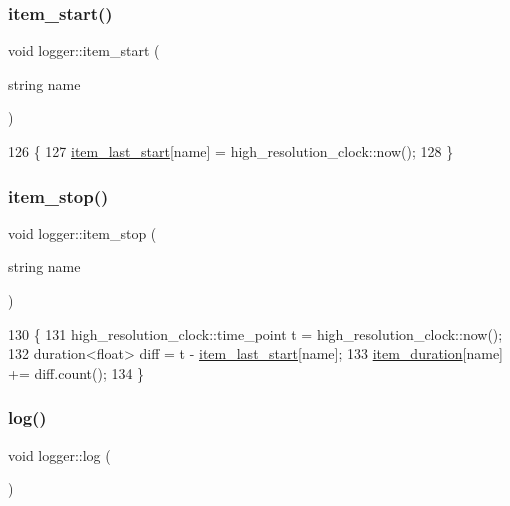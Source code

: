 \subsubsection{\texorpdfstring{item\+\_\+start()}{item\_start()}}
{\footnotesize\ttfamily void logger\+::item\+\_\+start (\begin{DoxyParamCaption}\item[{string}]{name }\end{DoxyParamCaption})\hspace{0.3cm}{\ttfamily [static]}}


\begin{DoxyCode}
126                                   \{
127   \hyperlink{classlogger_af21bf7ca37e55cf225b282ab2f312c95}{item\_last\_start}[name] = high\_resolution\_clock::now();
128 \}
\end{DoxyCode}
\mbox{\label{classlogger_a6775fee9681c437fc9c05d71cfbbe4a2}} 
\subsubsection{\texorpdfstring{item\+\_\+stop()}{item\_stop()}}
{\footnotesize\ttfamily void logger\+::item\+\_\+stop (\begin{DoxyParamCaption}\item[{string}]{name }\end{DoxyParamCaption})\hspace{0.3cm}{\ttfamily [static]}}


\begin{DoxyCode}
130                                  \{
131   high\_resolution\_clock::time\_point t = high\_resolution\_clock::now();
132   duration<float> diff = t - \hyperlink{classlogger_af21bf7ca37e55cf225b282ab2f312c95}{item\_last\_start}[name];
133   \hyperlink{classlogger_a8097637b66086185096030c96a1189ba}{item\_duration}[name] += diff.count();
134 \}
\end{DoxyCode}
\mbox{\label{classlogger_ab518e6d927694bb7329e933fa75c27bf}} 
\subsubsection{\texorpdfstring{log()}{log()}}
{\footnotesize\ttfamily void logger\+::log (\begin{DoxyParamCaption}{ }\end{DoxyParamCaption})\hspace{0.3cm}{\ttfamily [static]}}


